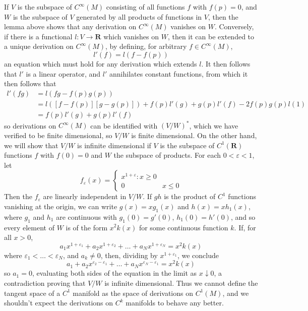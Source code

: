 If $V$ is the subspace of $C^\infty(M)$ consisting of all functions $f$ with $f(p) = 0$, and $W$ is the subspace of $V$ generated by all products of functions in $V$, then the lemma above shows that any derivation on $C^\infty(M)$ vanishes on $W$. Conversely, if there is a functional $l: V \to \mathbf{R}$ which vanishes on $W$, then it can be extended to a unique derivation on $C^\infty(M)$, by defining, for arbitrary $f \in C^\infty(M)$,
%
\[ l'(f) = l(f - f(p)) \]
%
an equation which must hold for any derivation which extends $l$. It then follows that $l'$ is a linear operator, and $l'$ annihilates constant functions, from which it then follows that
%
\begin{align*}
    l'(fg) &= l(fg - f(p)g(p))\\
    &= l([f - f(p)][g - g(p)]) + f(p) l'(g) + g(p) l'(f) - 2 f(p) g(p) l(1)\\
    &= f(p) l'(g) + g(p) l'(f)
\end{align*}
%
so derivations on $C^\infty(M)$ can be identified with $(V/W)^*$, which we have verified to be finite dimensional, so $V/W$ is finite dimensional. On the other hand, we will show that $V/W$ is infinite dimensional if $V$ is the subspace of $C^1(\mathbf{R})$ functions $f$ with $f(0) = 0$ and $W$ the subspace of products. For each $0 < \varepsilon < 1$, let
%
\[ f_\varepsilon(x) = \begin{cases} x^{1 + \varepsilon} : x \geq 0 \\ 0 & x \leq 0 \end{cases} \]
%
Then the $f_\varepsilon$ are linearly independent in $V/W$. If $gh$ is the product of $C^1$ functions vanishing at the origin, we can write $g(x) = xg_1(x)$ and $h(x) = xh_1(x)$, where $g_1$ and $h_1$ are continuous with $g_1(0) = g'(0)$, $h_1(0) = h'(0)$, and so every element of $W$ is of the form $x^2k(x)$ for some continuous function $k$. If, for all $x > 0$,
%
\[ a_1 x^{1 + \varepsilon_1} + a_2 x^{1 + \varepsilon_2} + \dots + a_N x^{1 + \varepsilon_N} = x^2k(x) \]
%
where $\varepsilon_1 < \dots < \varepsilon_N$, and $a_k \neq 0$, then, dividing by $x^{1 + \varepsilon_1}$, we conclude
%
\[ a_1 + a_2x^{\varepsilon_2 - \varepsilon_1} + \dots + a_N x^{\varepsilon_N - \varepsilon_1} = x^2 k(x) \]
%
so $a_1 = 0$, evaluating both sides of the equation in the limit as $x \downarrow 0$, a contradiction proving that $V/W$ is infinite dimensional. Thus we cannot define the tangent space of a $C^1$ manifold as the space of derivations on $C^1(M)$, and we shouldn't expect the derivations on $C^k$ manifolds to behave any better.

